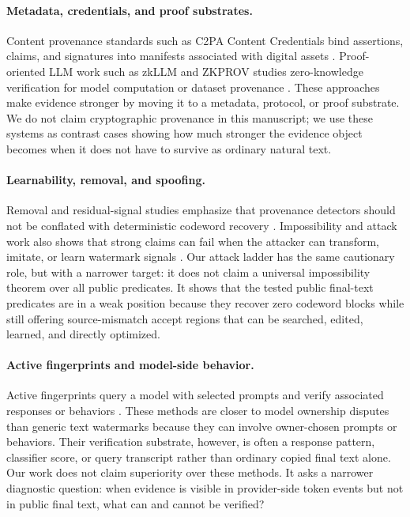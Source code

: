 \paragraph{Metadata, credentials, and proof substrates.}
Content provenance standards such as C2PA Content Credentials bind assertions,
claims, and signatures into manifests associated with digital assets
\cite{c2pa2025spec}.  Proof-oriented LLM work such as zkLLM and ZKPROV studies
zero-knowledge verification for model computation or dataset provenance
\cite{sun2024zkllm,namazi2025zkprov}.  These approaches make evidence stronger
by moving it to a metadata, protocol, or proof substrate.  We do not claim
cryptographic provenance in this manuscript; we use these systems as
contrast cases showing how much stronger the evidence object becomes when it
does not have to survive as ordinary natural text.

\paragraph{Learnability, removal, and spoofing.}
Removal and residual-signal studies emphasize that provenance detectors should
not be conflated with deterministic codeword recovery
\cite{chen2025demark,sander2024radioactive}.  Impossibility and attack work
also shows that strong claims can fail when the attacker can transform,
imitate, or learn watermark signals
\cite{zhang2023watermarkssand,gu2023learnability,an2025ditto}.  Our attack
ladder has the same cautionary role, but with a narrower target: it does not
claim a universal impossibility theorem over all public predicates.  It shows
that the tested public final-text predicates are in a weak position because
they recover zero codeword blocks while still offering source-mismatch accept
regions that can be searched, edited, learned, and directly optimized.

\paragraph{Active fingerprints and model-side behavior.}
Active fingerprints query a model with selected prompts and verify associated
responses or behaviors
\cite{xu2024instructional,zeng2024huref,russinovich2024chainhash,pasquini2025llmmap,yang2024fingerprint,yamabe2025mergeprint,xu2025ctcc,xu2025evertracer,bai2025esf,hu2025resf,nasery2025scalable,tsai2025rofl}.
These methods are closer to model ownership disputes than generic text
watermarks because they can involve owner-chosen prompts or behaviors.  Their
verification substrate, however, is often a response pattern, classifier score,
or query transcript rather than ordinary copied final text alone.  Our work
does not claim superiority over these methods.  It asks a narrower diagnostic
question: when evidence is visible in provider-side token events but not in
public final text, what can and cannot be verified?


